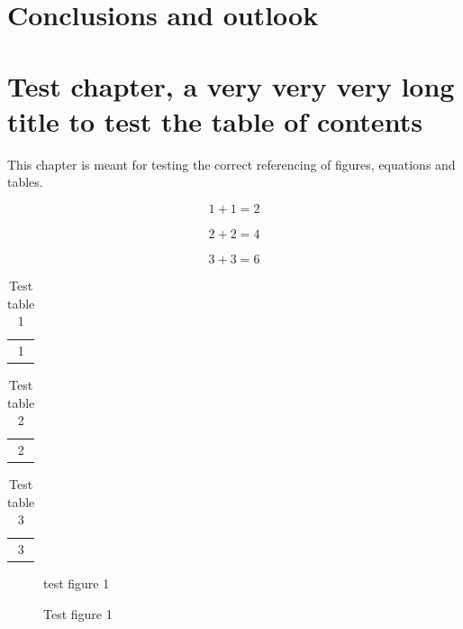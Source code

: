 \chapter{Conclusions and outlook}
%


\chapter{Test chapter, a very very very long title to test the table of contents}

This chapter is meant for testing the correct referencing of figures, equations
and tables.

%
\begin{equation}
	1 + 1 = 2
	\label{eq:test_eq1}
\end{equation}

\begin{align}
	2 + 2 = 4
	\label{eq:test_eq2}
\end{align}

\begin{equation}
	3 + 3 = 6
	\label{eq:test_eq3_intro}
\end{equation}

%
\begin{table}
	\centering
	\begin{tabular}{c}
		1
	\end{tabular}
	\caption{Test table 1}
	\label{tab:test_tab1}
\end{table}

\begin{table}
	\centering
	\begin{tabular}{c}
		2
	\end{tabular}
	\caption{Test table 2}
	\label{tab:test_tab2}
\end{table}

\begin{table}
	\centering
	\begin{tabular}{c}
		3
	\end{tabular}
	\caption{Test table 3}
	\label{tab:test_tab3_intro}
\end{table}

%
\begin{figure}[h!]
	\centering
	test figure 1
	\caption{Test figure 1}
	\label{fig:test_fig1}
\end{figure}


